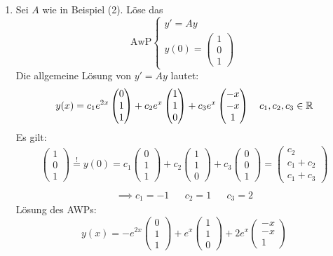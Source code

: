 \documentclass[a4paper,oneside,DIV15,BCOR12mm,chapterprefix=true,headings=onelinechapter]{scrbook}
\begin{document}
\begin{enumerate}
\item Sei $A$ wie in Beispiel (2). Löse das \[
\text{AwP}
\begin{cases}
y'=Ay\\
y(0) = \begin{pmatrix} 1 \\ 0 \\ 1 \end{pmatrix}
\end{cases}\]
Die allgemeine Lösung von $y' = Ay$ lautet: 
\[ y(x) = c_1  e^{2x}\begin{pmatrix} 0 \\ 1\\1 \end{pmatrix} 
+ c_2  e^x \begin{pmatrix} 1\\1\\0 \end{pmatrix} 
+ c_3 e^x \begin{pmatrix} -x \\ -x \\ 1 \end{pmatrix}\quad c_1, c_2, c_3 \in \mathbb{R} \]
Es gilt:
\begin{align*}
\begin{pmatrix} 1 \\ 0 \\ 1 \end{pmatrix} \stackrel!= y(0) 
= c_1  \begin{pmatrix} 0 \\ 1\\1 \end{pmatrix} 
+ c_2   \begin{pmatrix} 1\\1\\0 \end{pmatrix} 
+ c_3  \begin{pmatrix} 0 \\ 0 \\ 1 \end{pmatrix} 
= \begin{pmatrix} c_2 \\ c_1+c_2\\c_1+c_3 \end{pmatrix}\\
\end{align*}
\begin{align*}
\implies c_1=-1 &&c_2 = 1 && c_3 = 2
\end{align*}
Lösung des AWPs: 
\[y(x) = -e^{2x}\begin{pmatrix} 0 \\ 1\\1 \end{pmatrix} 
+ e^x \begin{pmatrix} 1\\1\\0 \end{pmatrix} 
+ 2e^x \begin{pmatrix} -x \\ -x \\ 1 \end{pmatrix}\]


\end{enumerate}
\end{document}
